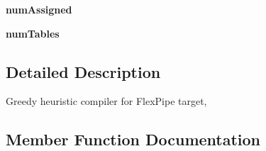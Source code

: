 \begin{DoxyCompactItemize}
\item 
\hypertarget{classmapper_1_1src_1_1flexpipe_1_1flexpipe__lpt__compiler_1_1_flexpipe_lpt_compiler_afd1baa321f1f28ce4b93d28e5162c13d}{}{\bfseries num\+Assigned}\label{classmapper_1_1src_1_1flexpipe_1_1flexpipe__lpt__compiler_1_1_flexpipe_lpt_compiler_afd1baa321f1f28ce4b93d28e5162c13d}

\item 
\hypertarget{classmapper_1_1src_1_1flexpipe_1_1flexpipe__lpt__compiler_1_1_flexpipe_lpt_compiler_a8ed6e0d175c63e8bf44feab545bd2fd2}{}{\bfseries num\+Tables}\label{classmapper_1_1src_1_1flexpipe_1_1flexpipe__lpt__compiler_1_1_flexpipe_lpt_compiler_a8ed6e0d175c63e8bf44feab545bd2fd2}

\end{DoxyCompactItemize}


\subsection{Detailed Description}
\begin{DoxyVerb}Greedy heuristic compiler for FlexPipe target, 
\end{DoxyVerb}
 

\subsection{Member Function Documentation}
\hypertarget{classmapper_1_1src_1_1flexpipe_1_1flexpipe__lpt__compiler_1_1_flexpipe_lpt_compiler_af1940fff29cef26de7e3cad85b76c077}{}
